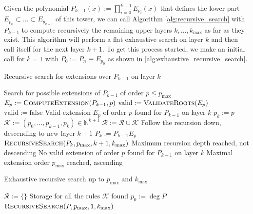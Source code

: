 \documentclass[a4paper,10pt]{article}
\begin{document}
Given the polynomial $P_{k-1}(x) := \prod_{i=0}^{k-1} E_{p_i}(x)$ that defines the
lower part $E_{p_0} \subset \ldots \subset E_{p_{k-1}}$ of this tower,
we can call Algorithm \ref{alg:recursive_search} with $P_{k-1}$ to compute recursively the remaining
upper layers $k, \ldots, k_{\textrm{max}}$ as far as they exist. This algorithm will perform a
flat exhaustive search on layer $k$ and then call itself for the next layer $k+1$. To get this
process started, we make an initial call for $k=1$ with $P_{0} := P_n \equiv E_{p_0}$ as shown
in \ref{alg:exhaustive_recursive_search}.

\begin{algorithm}
  \caption{Recursive search for extensions over $P_{k-1}$ on layer $k$}
  \label{alg:recursive_search}
  \begin{algorithmic}
    \State {}
    \Comment Search for possible extensions of $P_{k-1}$ of order $p \leq p_{\textrm{max}}$
      \State $E_p := \textsc{ComputeExtension}(P_{k-1}, p)$
        \State $\mathrm{valid} := \textsc{ValidateRoots}(E_p)$
      \Else
        \State $\mathrm{valid} := \mathrm{false}$
      \EndIf
        \State {}
        \Comment Valid extension $E_p$ of order $p$ found for $P_{k-1}$ on layer $k$
        \State $p_k := p$
        \State $\mathcal{K} := (p_0, \ldots, p_{k-1}, p_k) \in \mathbb{N}^{k+1}$
        \State $\mathcal{R} := \mathcal{R} \cup \mathcal{K}$
          \State {}
          \Comment Follow the recursion down, descending to new layer $k+1$
          \State $P_{k} := P_{k-1} E_p$
          \State $\textsc{RecursiveSearch}(P_{k}, p_{\textrm{max}}, k+1, k_{\textrm{max}})$
        \Else
          \State {}
          \Comment Maximum recursion depth reached, not descending
        \EndIf
      \Else
        \State {}
        \Comment No valid extension of order $p$ found for $P_{k-1}$ on layer $k$
      \EndIf
    \EndFor
    \State {}
    \Comment Maximal extension order $p_{\textrm{max}}$ reached, ascending
    \EndProcedure
  \end{algorithmic}
\end{algorithm}

\begin{algorithm}
  \caption{Exhaustive recursive search up to $p_{\textrm{max}}$ and $k_{\textrm{max}}$}
  \label{alg:exhaustive_recursive_search}
  \begin{algorithmic}
      \State $\mathcal{R} := \{\}$
      \Comment Storage for all the rules $\mathcal{K}$ found
      \State $p_0 := \deg P$
      \State $\textsc{RecursiveSearch}(P, p_{\textrm{max}}, 1, k_{\textrm{max}})$
    \EndProcedure
  \end{algorithmic}
\end{algorithm}
\end{document}
